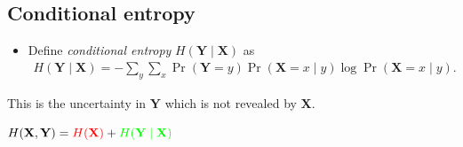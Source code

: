 \documentclass{beamer}
\let\stoch\mathbf{}
\begin{document}
\subsection{Conditional entropy}

\begin{frame}
  \begin{definition}
    \begin{itemize}
      \item Define \emph{conditional entropy} \(H(\stoch Y\mid \stoch X)\) 
        as
        \begin{align*}
          H(\stoch Y\mid \stoch X) = %
          -\sum_y\sum_x \Pr(\stoch Y = y)\Pr(\stoch X = x\mid y)\log \Pr(\stoch 
          X = x\mid y).
        \end{align*}
    \end{itemize}
  \end{definition}

  \pause{}

  \begin{remark}
    This is the uncertainty in \(\stoch Y\) which is not revealed by \(\stoch 
      X\).
  \end{remark}
\end{frame}

\begin{frame}
  \begin{theorem}
    \(H(\stoch X, \stoch Y) = {\color{red}H(\stoch X)} + {\color{green}H(\stoch 
        Y\mid \stoch X)}\)
  \end{theorem}

  \begin{center}
  \end{center}
\end{frame}

\end{document}
